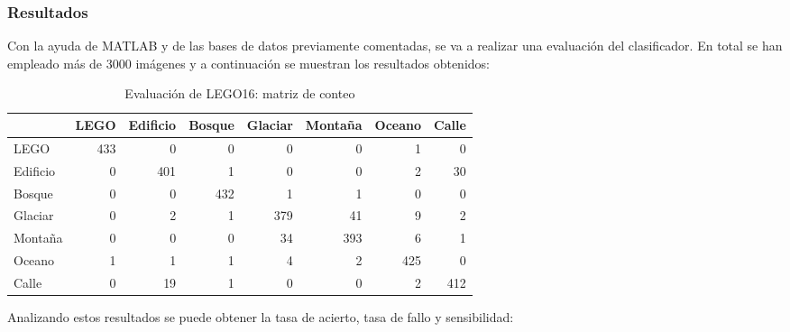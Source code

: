 
\subsubsection*{Resultados}
Con la ayuda de MATLAB y de las bases de datos previamente comentadas, se va a realizar una evaluación del clasificador. En total se han empleado más de 3000 imágenes y a continuación se muestran los resultados obtenidos:

\begin{table}[ht]
  \centering
    \begin{tabular}{|l|*{7}{r|}}
\cline{2-8}    \multicolumn{1}{r|}{} & \multicolumn{1}{l|}{LEGO} & \multicolumn{1}{l|}{Edificio} & \multicolumn{1}{l|}{Bosque} & \multicolumn{1}{l|}{Glaciar} & \multicolumn{1}{l|}{Montaña} & \multicolumn{1}{l|}{Oceano} & \multicolumn{1}{l|}{Calle} \\
    \hline
    LEGO  & 433   & 0     & 0     & 0     & 0     & 1     & 0 \\
    \hline
    Edificio & 0     & 401   & 1     & 0     & 0     & 2     & 30 \\
    \hline
    Bosque & 0     & 0     & 432   & 1     & 1     & 0     & 0 \\
    \hline
    Glaciar & 0     & 2     & 1     & 379   & 41    & 9    & 2 \\
    \hline
    Montaña & 0     & 0     & 0     & 34    & 393   & 6    & 1 \\
    \hline
    Oceano & 1     & 1     & 1     & 4     & 2     & 425   & 0 \\
    \hline
    Calle & 0     & 19    & 1     & 0     & 0     & 2     & 412 \\
    \hline
    \end{tabular}%
  \label{tab:LEGO16 results}%
  \caption{Evaluación de LEGO16: matriz de conteo}
\end{table}%

Analizando estos resultados se puede obtener la tasa de acierto, tasa de fallo y sensibilidad:

